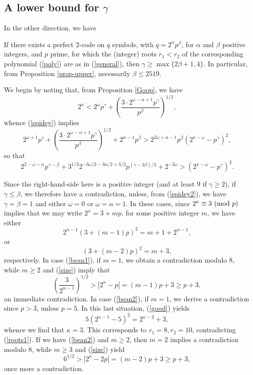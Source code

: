 \documentclass{amsart}
\def\mod#1{{\ifmmode\text{\rm\ (mod~$#1$)}
\else\discretionary{}{}{\hbox{ }}\rm(mod~$#1$)\fi}}
\begin{document}
{ \subsection{A lower bound for $\gamma$}
 In the other direction, we have
 \begin{prop} \label{prop-lower}
 If there exists a perfect $2$-code on $q$ symbols, with $q=2^\alpha p^\beta$, for $\alpha$ and $\beta$  positive integers, and $p$ prime, for which the (integer) roots $r_1<r_2$ of the corresponding polynomial (\ref{poly}) are as in (\ref{general}), then 
 $\gamma \geq \max \{ 2 \beta+1, 4 \}$. In particular, from Proposition \ref{prop-upper}, necessarily $\beta \leq 2519$.
 \end{prop}
 We begin by noting that, from Proposition \ref{Goop}, we have
$$
2^\kappa <2^\omega p^\gamma + \left( \frac{3 \cdot 2^{\omega-\alpha+1} p^\gamma}{p^\beta} \right)^{1/2},
$$
whence (\ref{spidey}) implies
$$
2^{\omega+1}  p^\gamma + \left( \frac{3 \cdot 2^{\omega-\alpha+1} p^\gamma}{p^\beta} \right)^{1/2} +2^{\alpha-1} p^\beta > 2^{2 \omega+\alpha-1} p^\beta (2^{\kappa-\omega}- p^\gamma)^2,
$$
so that 
\begin{equation} \label{kook}
2^{2-\omega-\alpha} p^{\gamma-\beta}+ 3^{1/2} 2^{-3\omega/2-3\alpha/2+3/2} p^{(\gamma-3\beta)/2}
+2^{-2\omega} > (2^{\kappa-\omega}- p^\gamma)^2.
\end{equation}

 Since the right-hand-side here is a positive integer (and at least $9$ if $\gamma \geq 2$), if $\gamma \leq \beta$, we therefore have a contradiction, unless, from (\ref{spidey2}), we have 
$\gamma=\beta =1$ and either $\omega=0$ or $\omega=\alpha=1$. In these cases,
since $2^\kappa \equiv 3 \mod{p}$ implies that we may write 
$2^\kappa = 3 +m  p$, for some positive integer $m$, we have either
\begin{equation} \label{bean1}
2^{\alpha-1} (3+(m-1)p)^2 = m+1 +2^{\alpha-1},
\end{equation}
or
\begin{equation} \label{bean2}
(3+(m-2) p)^2 = m+3,
\end{equation}
respectively.
In case (\ref{bean1}), if $m=1$, we obtain a contradiction modulo $8$, while $m \geq 2$ and (\ref{size}) imply that
$$
\left( \frac{3 }{2^{\alpha-1}} \right)^{1/2} > |2^\kappa-p| = (m-1)p+3 \geq p+3,
$$
an immediate contradiction. In case (\ref{bean2}), if $m=1$, we derive a contradiction since $p >3$, unless $p=5$. In this last situation, (\ref{good}) yields
$$
5 (2^{\kappa-1}-5)^2 = 2^{\kappa-2}+3,
$$
whence we find that $\kappa=3$. This corresponds to $r_1=8, r_2=10$, contradicting (\ref{roots1}). If we have (\ref{bean2}) and $m \geq 2$, then $m=2$ implies a contradiction modulo $8$, while $m \geq 3$ and (\ref{size}) yield 
$$
6^{1/2} > |2^\kappa-2p| = (m-2)p+3 \geq p+3,
$$
once more a contradiction.

}
\end{document}
